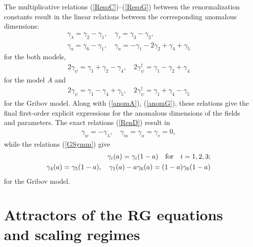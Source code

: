 \documentclass[12pt]{iopart}
\begin{document}
The multiplicative relations (\ref{ResoC})--(\ref{ResoG})
between the renormalization constants result in the linear relations
between the corresponding anomalous dimensions:
\begin{eqnarray}
\gamma_{\lambda} =  \gamma_{2} -\gamma_{1}, \quad
\gamma_{\tau} =  \gamma_{3} -\gamma_{2} , \nonumber \\
\gamma_{a} =  \gamma_{6} -\gamma_{1}, \quad
\gamma_{u} = -\gamma_{1}- 2\gamma_{2} +\gamma_{4} + \gamma_{5}
\label{aesoC}
\end{eqnarray}
for the both models,
\begin{eqnarray}
2\gamma_{\psi}= \gamma_{1} +\gamma_{2} -\gamma_{4}, \quad
2\gamma_{\psi}^{\dag}= \gamma_{1} - \gamma_{2} + \gamma_{4}
\label{aesoA}
\end{eqnarray}
for the model {\it A} and
\begin{eqnarray}
2\gamma_{\psi}= \gamma_{1}- \gamma_{4} + \gamma_{5}, \quad
2\gamma_{\psi}^{\dag}= \gamma_{1}+ \gamma_{4} -  \gamma_{5}
\label{aesoG}
\end{eqnarray}
for the Gribov model. Along with (\ref{anomA}), (\ref{anomG}), these
relations give the final
first-order explicit expressions for the anomalous dimensions of the
fields and parameters. The exact relations (\ref{RenD}) result in
\begin{eqnarray}
\gamma_{w} =-\gamma_{\lambda}, \quad
\gamma_{m} =\gamma_{\alpha} =\gamma_{v} = 0,
\label{exi}
\end{eqnarray}
while the relations (\ref{GSymm}) give
\begin{eqnarray}
\gamma_{i} (a) = \gamma_{i} (1-a) \quad {\rm for} \quad i=1,2,3;
\nonumber \\
\gamma_{4} (a) = \gamma_{5} (1-a), \quad
\gamma_{1} (a) -a \gamma_{6}(a) = (1-a) \gamma_{6}(1-a)
\label{SymmG}
\end{eqnarray}
for the Gribov model.



\section{Attractors of the RG equations and scaling regimes} \label{sec:FPS}
\end{document}
